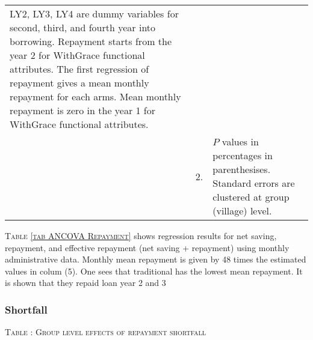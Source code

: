 \begin{minipage}[t]{14cm}
\begin{tabular}{>{\hfill\scriptsize}p{1cm}<{}>{\hfill\scriptsize}p{.25cm}<{}>{\scriptsize}p{12cm}<{\hfill}}
\textsf{LY2, LY3, LY4} are dummy variables for second, third, and fourth year into borrowing.  Repayment starts from the year 2 for \textsf{WithGrace} functional attributes. The first regression of repayment gives a mean monthly repayment for each arms. Mean monthly repayment is zero in the year 1 for \textsf{WithGrace} functional attributes.\\
& 2. & $P$ values in percentages in parenthesises. Standard errors are clustered at group (village) level.
\end{tabular}
\end{minipage}


\begin{palepinkleftbar}
\begin{finding}
\textsc{\small Table \ref{tab ANCOVA Repayment}} shows regression results for net saving, repayment, and effective repayment (net saving + repayment) using monthly administrative data. Monthly mean repayment is given by 48 times the estimated values in colum (5). One sees that \textsf{traditional} has the lowest mean repayment. It is shown that they repaid loan year 2 and 3 

\end{finding}
\end{palepinkleftbar}

\subsubsection{Shortfall}
\label{AppendixShortfall}

\hspace{-1cm}\begin{minipage}[t]{14cm}
\hfil\textsc{\normalsize Table \thetable: Group level effects of repayment shortfall\label{tab shortfall group}}\\
\setlength{\tabcolsep}{1pt}
\setlength{\baselineskip}{8pt}
\renewcommand{\arraystretch}{.6}
\hfil{}
\end{minipage}

